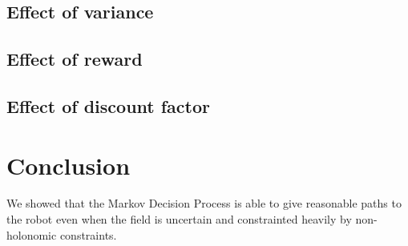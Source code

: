 \documentclass[a4paper]{article}
\begin{document}
\subsection{Effect of variance}

\subsection{Effect of reward}

\subsection{Effect of discount factor}

\section{Conclusion}
We showed that the Markov Decision Process is able to give reasonable paths
to the robot even when the field is uncertain and constrainted heavily by
non-holonomic constraints.
\end{document}
